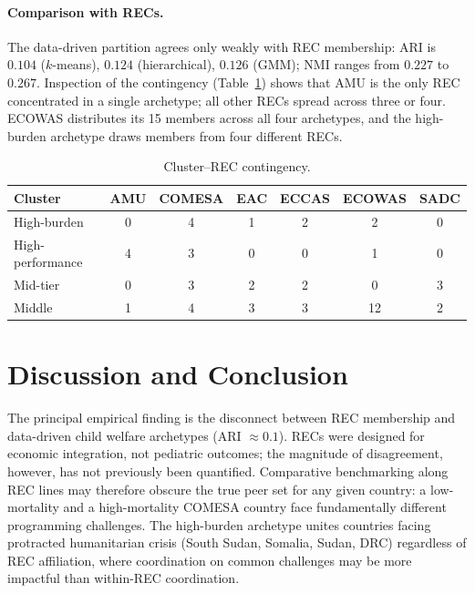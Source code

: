 \documentclass[runningheads]{llncs}
\begin{document}
\paragraph{Comparison with RECs.} The data-driven partition agrees only weakly with REC membership: ARI is $0.104$ ($k$-means), $0.124$ (hierarchical), $0.126$ (GMM); NMI ranges from $0.227$ to $0.267$. Inspection of the contingency (Table~\ref{tab:cont}) shows that AMU is the only REC concentrated in a single archetype; all other RECs spread across three or four. ECOWAS distributes its 15 members across all four archetypes, and the high-burden archetype draws members from four different RECs.

\begin{table}[t]
\caption{Cluster--REC contingency.}\label{tab:cont}
\centering\small\setlength{\tabcolsep}{6pt}
\begin{tabular}{lcccccc}
\toprule
Cluster & AMU & COMESA & EAC & ECCAS & ECOWAS & SADC \\
\midrule
High-burden     & 0 & 4 & 1 & 2 & 2 & 0 \\
High-performance& 4 & 3 & 0 & 0 & 1 & 0 \\
Mid-tier        & 0 & 3 & 2 & 2 & 0 & 3 \\
Middle          & 1 & 4 & 3 & 3 & 12 & 2 \\
\bottomrule
\end{tabular}
\end{table}

\section{Discussion and Conclusion}\label{sec:discussion}

The principal empirical finding is the disconnect between REC membership and data-driven child welfare archetypes (ARI $\approx 0.1$). RECs were designed for economic integration, not pediatric outcomes; the magnitude of disagreement, however, has not previously been quantified. Comparative benchmarking along REC lines may therefore obscure the true peer set for any given country: a low-mortality and a high-mortality COMESA country face fundamentally different programming challenges. The high-burden archetype unites countries facing protracted humanitarian crisis (South Sudan, Somalia, Sudan, DRC) regardless of REC affiliation, where coordination on common challenges may be more impactful than within-REC coordination.
\end{document}
